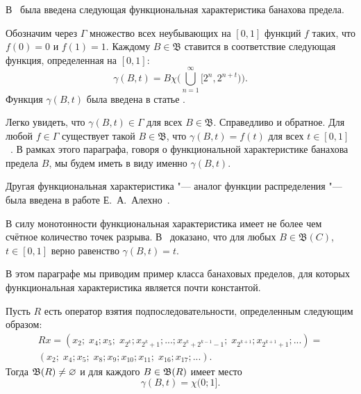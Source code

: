 В~\cite{semenov2019mainclasses_rus} была введена следующая функциональная характеристика банахова предела.

Обозначим через $\Gamma$ множество всех неубывающих на $[0, 1]$ функций $f$ таких,
что $f(0) = 0$ и $f(1) = 1$. Каждому $B \in \mathfrak B$
ставится в соответствие следующая функция, определенная на $[0, 1]$:
$$
        \gamma(B, t) = B \chi\Bigg(\bigcup^\infty_{n = 1} [2^n, 2^{n + t})\Bigg)
        .
$$
Функция $\gamma(B,t)$ была введена в статье \cite{semenov2019mainclasses_rus}.

Легко увидеть, что $\gamma (B, t) \in \Gamma$ для всех $B \in \mathfrak B$.
Справедливо и обратное. Для любой $f \in \Gamma$ существует такой
$B \in \mathfrak B$, что $\gamma(B, t) = f(t)$ для всех
$t \in [0, 1]$~\cite[Предложение 2]{semenov2019mainclasses_rus}.
В рамках этого параграфа, говоря о функциональной характеристике банахова предела $B$,
мы будем иметь в виду именно $\gamma(B,t)$.

Другая функциональная характеристика "--- аналог функции распределения "--- была введена в работе Е.~А.~Алехно~\cite{alekhno2015banach}.

В силу монотонности функциональная характеристика имеет не более чем счётное количество точек разрыва.
В~\cite[Теорема 23]{semenov2019mainclasses_rus} доказано, что
для любых $B \in \mathfrak B(C)$, $t \in [0, 1]$ верно равенство $\gamma (B, t) = t$.

В этом параграфе мы приводим пример класса банаховых пределов,
для которых функциональная характеристика является почти константой.

\begin{lemma}
    Пусть $R$ есть оператор взятия подпоследовательности, определенным следующим образом:
	\begin{multline}
		\label{eq:sprawling_R}
		Rx = (x_2; \; x_4; x_5; \; x_{2^k}; x_{2^k + 1}; ... ; x_{2^k + 2^{k-1} - 1}; \; x_{2^{k+1}}; x_{2^{k+1} + 1};...)
		=\\
		(x_2; \; x_4; x_5; \; x_8; x_9; x_{10}; x_{11}; \; x_{16}; x_{17}; ...)
		.
	\end{multline}
    Тогда $\mathfrak{B}(R) \ne\varnothing$ и для каждого $B\in \mathfrak{B}(R)$ имеет место
    \begin{equation}
        \gamma(B, t) = \chi(0;1]
        .
    \end{equation}
\end{lemma}


